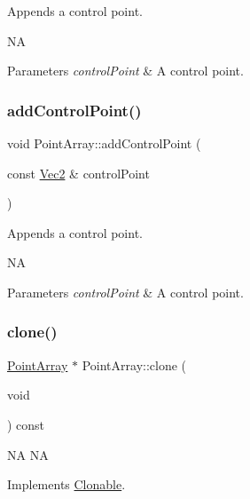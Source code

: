 Appends a control point.

NA 
\begin{DoxyParams}{Parameters}
{\em control\+Point} & A control point. \\
\hline
\end{DoxyParams}
\mbox{\label{classPointArray_af2994ad7c7fcd61f42a97dc69e1bda99}} 
\subsubsection{\texorpdfstring{add\+Control\+Point()}{addControlPoint()}\hspace{0.1cm}{\footnotesize\ttfamily [2/2]}}
{\footnotesize\ttfamily void Point\+Array\+::add\+Control\+Point (\begin{DoxyParamCaption}\item[{const \hyperlink{classVec2}{Vec2} \&}]{control\+Point }\end{DoxyParamCaption})}

Appends a control point.

NA 
\begin{DoxyParams}{Parameters}
{\em control\+Point} & A control point. \\
\hline
\end{DoxyParams}
\mbox{\label{classPointArray_aa8b6e9b63e2652488a4225561f2f8487}} 
\subsubsection{\texorpdfstring{clone()}{clone()}\hspace{0.1cm}{\footnotesize\ttfamily [1/2]}}
{\footnotesize\ttfamily \hyperlink{classPointArray}{Point\+Array} $\ast$ Point\+Array\+::clone (\begin{DoxyParamCaption}\item[{void}]{ }\end{DoxyParamCaption}) const\hspace{0.3cm}{\ttfamily [virtual]}}

NA  NA 

Implements \hyperlink{classClonable_a36b05a0fa605f4f269e5884bde7f9e0c}{Clonable}.

